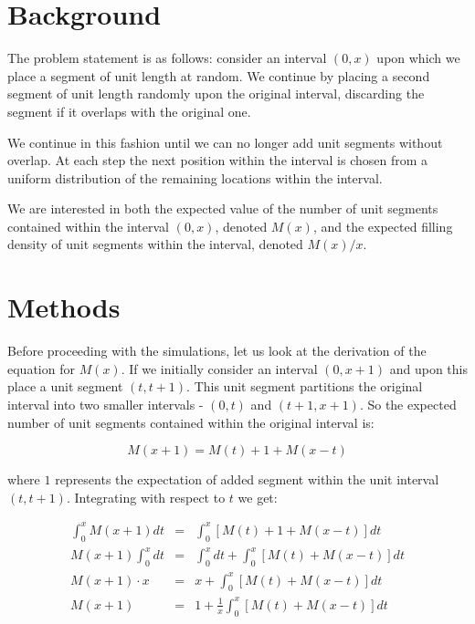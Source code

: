 \documentclass{report}
\begin{document}
\chapter{Background}

The problem statement is as follows: consider an interval $(0, x)$ upon which we place a segment of unit 
length at random. We continue by placing a second segment of unit length randomly upon the original 
interval, discarding the segment if it overlaps with the original one. \bigskip

We continue in this fashion until we can no longer add unit segments without overlap. At each step the 
next position within the interval is chosen from a uniform distribution of the remaining locations within 
the interval. \bigskip

We are interested in both the expected value of the number of unit segments contained within the interval 
$(0, x)$, denoted $M(x)$, and the expected filling density of unit segments within the interval, denoted 
$M(x) / x$. \bigskip






\chapter{Methods}

Before proceeding with the simulations, let us look at the derivation of the equation for $M(x)$. If we 
initially consider an interval $(0, x + 1)$ and upon this place a unit segment $(t, t + 1)$. This unit 
segment partitions the original interval into two smaller intervals - $(0, t)$ and $(t + 1, x + 1)$. So 
the expected number of unit segments contained within the original interval is: \bigskip

\[
	M(x + 1) = M(t) + 1 + M(x - t)
\]\medskip

where $1$ represents the expectation of added segment within the unit interval $(t, t + 1)$. Integrating 
with respect to $t$ we get: \bigskip

\begin{eqnarray*} 
	\int_{0}^{x} M(x + 1) dt & = & \int_{0}^{x} [M(t) + 1 + M(x - t)] dt \\
    M(x + 1) \int_{0}^{x} dt & = & \int_{0}^{x} dt + \int_{0}^{x} [M(t) + M(x - t)] dt \\
            M(x + 1) \cdot x & = & x + \int_{0}^{x} [M(t) + M(x - t)] dt \\
	                M(x + 1) & = & 1 + \frac{1}{x} \int_{0}^{x} [M(t) + M(x - t)] dt 
\end{eqnarray*}\medskip
\end{document}
